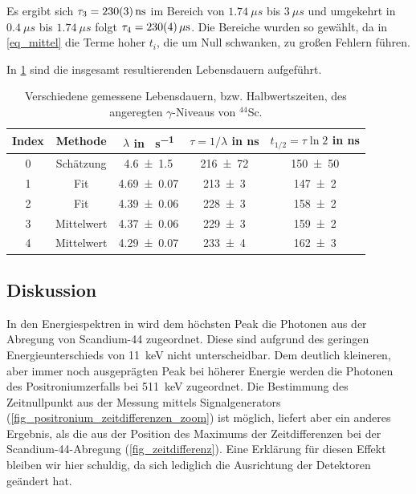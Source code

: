 \documentclass[
	a4paper,
	12pt,
	pagesize,
	ngerman
]{scrartcl}
\begin{document}
		Es ergibt sich $\tau_3=\SI{230+-3}{ns}$ im Bereich von $\SI{1.74}{\mu s}$ bis $\SI{3}{\mu s}$ und umgekehrt in $\SI{0.4}{\mu s}$ bis $\SI{1.74}{\mu s}$ folgt $\tau_4=\SI{230+-4}{\mu s}$.
		Die Bereiche wurden so gewählt, da in \cref{eq_mittel} die Terme hoher $t_i$, die um Null schwanken, zu großen Fehlern führen.

		In \cref{tb_leb} sind die insgesamt resultierenden Lebensdauern aufgeführt.
		\begin{table}[H]
		\centering
		\begin{tabular}{c| c | c | c | c  }
			 Index&Methode&$\lambda$ in \si{\mu s^{-1}}& $\tau=1/\lambda$ in \si{ns} &$t_{1/2}=\tau\ln 2$ in \si{ns}\\ \hline
			 0&Schätzung&\SI{4.6+-1.5}{}&\SI{216+-72}{}&\SI{150+-50}{}\\
			 1&Fit&\SI{4.69+-0.07}{}&\SI{213+-3}{}&\SI{147+-2}{} \\
			 2&Fit&\SI{4.39+-0.06}{}&\SI{228+-3}{}&\SI{158+-2}{} \\
			 3&Mittelwert&\SI{4.37+-0.06}{}&\SI{229+-3}{}&\SI{159+-2}{}\\
			 4&Mittelwert&\SI{4.29+-0.07}{}&\SI{233+-4}{}&\SI{162+-3}{}\\
		\end{tabular}
		\caption{
		Verschiedene gemessene Lebensdauern, bzw. Halbwertszeiten, des angeregten $\gamma$-Niveaus von $^{44}$Sc.
		}
			 \label{tb_leb}
	\end{table}
	\subsection{Diskussion}
	In den Energiespektren in  wird dem höchsten Peak die Photonen aus der Abregung von Scandium-44 zugeordnet.
	Diese sind aufgrund des geringen Energieunterschieds von \SI{11}{keV} nicht unterscheidbar.
	Dem deutlich kleineren, aber immer noch ausgeprägten Peak bei höherer Energie werden die Photonen des Positroniumzerfalls bei \SI{511}{keV} zugeordnet.
	Die Bestimmung des Zeitnullpunkt aus der Messung mittels Signalgenerators (\cref{fig_positronium_zeitdifferenzen_zoom}) ist möglich, liefert aber ein anderes Ergebnis, als die aus der Position des Maximums der Zeitdifferenzen bei der Scandium-44-Abregung (\cref{fig_zeitdifferenz}).
	Eine Erklärung für diesen Effekt bleiben wir hier schuldig, da sich lediglich die Ausrichtung der Detektoren geändert hat.
\end{document}
